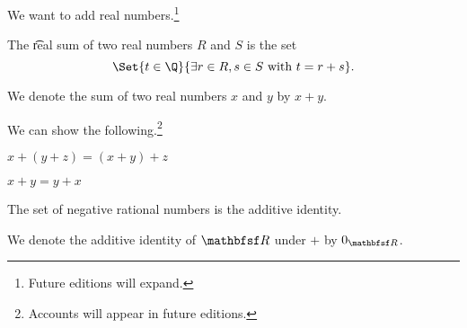 

We want to add real numbers.\footnote{Future editions will expand.}


The \t{real sum} of two real numbers $R$ and $S$ is the set
\[
  \Set{t \in \Q}{\exists r \in R, s \in S \text{ with } t = r + s}.
\]


We denote the sum of two real numbers $x$ and $y$ by $x + y$.


We can show the following.\footnote{Accounts will appear in future editions.}

\begin{proposition}[Associative]
  $x + (y + z) = (x + y) + z$
\end{proposition}

\begin{proposition}[Commutative]
  $x + y = y + x$
\end{proposition}

\begin{proposition}[Identity]
  The set of negative rational numbers is the additive identity.
\end{proposition}

We denote the additive identity of $\R$ under $+$ by $0_{\R}$.

\blankpage
